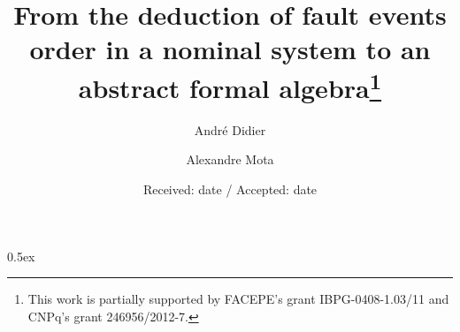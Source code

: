 \documentclass{svjour3}
\begin{document}
\title{From the deduction of fault events order in a nominal system to an abstract formal algebra\thanks{This work is partially supported by FACEPE's grant IBPG-0408-1.03/11 and CNPq's grant 246956/2012-7.}}

\author{André Didier \and Alexandre Mota}

\date{Received: date / Accepted: date}


%
\parindent 0pt\parskip 0.5ex



%



%
%
\end{document}
